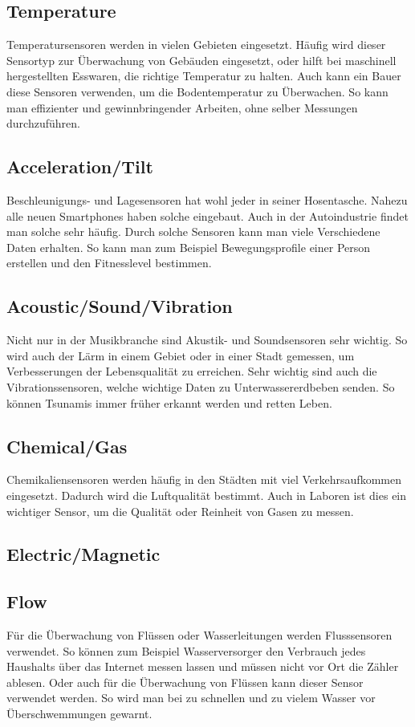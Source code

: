 \subsection{Temperature}
Temperatursensoren werden in vielen Gebieten eingesetzt. Häufig wird dieser Sensortyp zur Überwachung von Gebäuden eingesetzt, oder hilft bei maschinell hergestellten Esswaren, die richtige Temperatur zu halten. Auch kann ein Bauer diese Sensoren verwenden, um die Bodentemperatur zu Überwachen. So kann man effizienter und gewinnbringender Arbeiten, ohne selber Messungen durchzuführen. 
\subsection{Acceleration/Tilt}
Beschleunigungs- und Lagesensoren hat wohl jeder in seiner Hosentasche. Nahezu alle neuen Smartphones haben solche eingebaut. Auch in der Autoindustrie findet man solche sehr häufig. Durch solche Sensoren kann man viele Verschiedene Daten erhalten. So kann man zum Beispiel Bewegungsprofile einer Person erstellen und den Fitnesslevel bestimmen.
\subsection{Acoustic/Sound/Vibration}
Nicht nur in der Musikbranche sind Akustik- und Soundsensoren sehr wichtig. So wird auch der Lärm in einem Gebiet oder in einer Stadt gemessen, um Verbesserungen der Lebensqualität zu erreichen. Sehr wichtig sind auch die Vibrationssensoren, welche wichtige Daten zu Unterwassererdbeben senden. So können Tsunamis immer früher erkannt werden und retten Leben. 
\subsection{Chemical/Gas}
Chemikaliensensoren werden häufig in den Städten mit viel Verkehrsaufkommen eingesetzt. Dadurch wird die Luftqualität bestimmt. Auch in Laboren ist dies ein wichtiger Sensor, um die Qualität oder Reinheit von Gasen zu messen.
\subsection{Electric/Magnetic}

\subsection{Flow}
Für die Überwachung von Flüssen oder Wasserleitungen werden Flusssensoren verwendet. So können zum Beispiel Wasserversorger den Verbrauch jedes Haushalts über das Internet messen lassen und müssen nicht vor Ort die Zähler ablesen. Oder auch für die Überwachung von Flüssen kann dieser Sensor verwendet werden. So wird man bei zu schnellen und zu vielem Wasser vor Überschwemmungen gewarnt.
